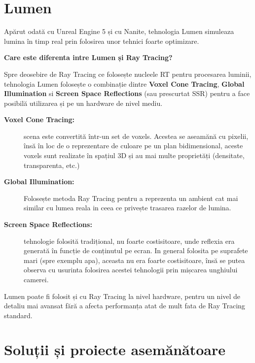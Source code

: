 \section{Lumen}

Apărut odată cu Unreal Engine 5 și cu Nanite, tehnologia Lumen simuleaza lumina în timp real prin folosirea unor tehnici foarte optimizare.

\textbf{Care este diferenta intre Lumen și Ray Tracing?}

Spre deosebire de Ray Tracing ce folosește nucleele RT pentru procesarea luminii, tehnologia Lumen folosește o combinație dintre \textbf{Voxel Cone Tracing}, \textbf{Global Illumination} si \textbf{Screen Space Reflections} (sau prescurtat SSR) pentru a face posibilă utilizarea și pe un hardware de nivel mediu. 

\begin{adjustwidth}{2em}{0pt}
\begin{description}
    \item[\textbf{Voxel Cone Tracing:}] scena este convertită într-un set de voxels. Acestea se aseamănă cu pixelii, însă în loc de o reprezentare de culoare pe un  plan bidimensional, aceste voxels sunt realizate în spațiul 3D și au mai multe proprietăți (densitate, transparenta, etc.) 
    \item[\textbf{Global Illumination:}] Folosește metoda Ray Tracing pentru a reprezenta un ambient cat mai similar cu lumea reala in ceea ce privește trasarea razelor de lumina.
    \item[\textbf{Screen Space Reflections:}] tehnologie folosită tradițional, nu foarte costisitoare, unde reflexia era generată în funcție de conținutul pe ecran. In general folosita pe suprafete mari (spre exemplu apa), aceasta nu era foarte costisitoare, însă se putea observa cu usurinta folosirea acestei tehnologii prin mișcarea unghiului camerei.
\end{description}
\end{adjustwidth}

\noindent Lumen poate fi folosit și cu Ray Tracing la nivel hardware, pentru un nivel de detaliu mai avansat fără a afecta performanța atat de mult fata de Ray Tracing standard.







\section{Soluții și proiecte asemănătoare}

